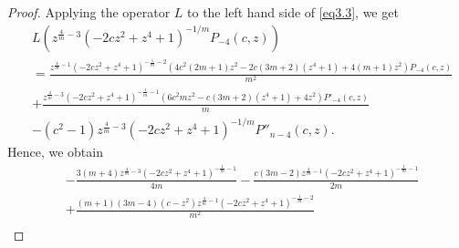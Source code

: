 \documentclass[review,nopreprintline]{elsarticle}
\theoremstyle{definition}
\numberwithin{equation}{section}
\theoremstyle{remark}
\begin{document}
\begin{proof}
	     Applying the  operator $L$ to the left hand side of \eqref{eq3.3}, we get
	        \begin{align*}
	            &L \left(z^{\frac{4}{m}-3} \left(-2 c z^2+z^4+1\right)^{-1/m} P_{-4}(c,z)\right)\\
	            &=\frac{z^{\frac{4}{m}-1} \left(-2 c z^2+z^4+1\right)^{-\frac{1}{m}-2} \left(4 c^2 (2 m+1) z^2-2 c (3 m+2) \left(z^4+1\right)+4 (m+1) z^2\right) P_{-4}(c,z)}{m^2}\\
	            &+\frac{z^{\frac{4}{m}-3} \left(-2 c z^2+z^4+1\right)^{-\frac{1}{m}-1} \left(6 c^2 m z^2-c (3 m+2) \left(z^4+1\right)+4 z^2\right) P'_{-4}(c,z)}{m}\\
	            &-\left(c^2-1\right) z^{\frac{4}{m}-3} \left(-2 c z^2+z^4+1\right)^{-1/m} P''_{n-4}(c,z).
	        \end{align*}
	        Hence, we obtain 
	        \begin{align*}
	            &-\frac{3 (m+4) z^{\frac{4}{m}-3} \left(-2 c z^2+z^4+1\right)^{-\frac{1}{m}-1}}{4 m}-\frac{c (3 m-2) z^{\frac{4}{m}-1} \left(-2 c z^2+z^4+1\right)^{-\frac{1}{m}-1}}{2 m}\\
	            &+\frac{(m+1) (3 m-4) \left(c-z^2\right) z^{\frac{4}{m}-1} \left(-2 c z^2+z^4+1\right)^{-\frac{1}{m}-2}}{m^2}\\

\end{align*}
\end{proof}
\end{document}

